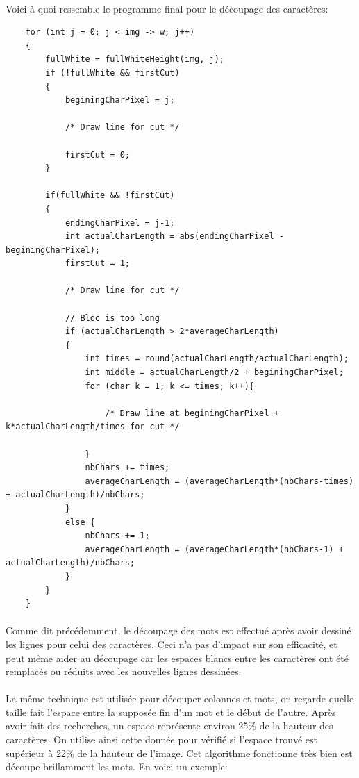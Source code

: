 \documentclass{article}
\begin{document}
	\paragraph{}
	Voici à quoi ressemble le programme final pour le découpage des caractères:
	\begin{lstlisting}
	for (int j = 0; j < img -> w; j++)
    {
        fullWhite = fullWhiteHeight(img, j);
        if (!fullWhite && firstCut)
        {
            beginingCharPixel = j;

            /* Draw line for cut */

            firstCut = 0;
        }
        
        if(fullWhite && !firstCut) 
        {
            endingCharPixel = j-1;
            int actualCharLength = abs(endingCharPixel - beginingCharPixel);
            firstCut = 1;
            
            /* Draw line for cut */

            // Bloc is too long
            if (actualCharLength > 2*averageCharLength)
            {
                int times = round(actualCharLength/actualCharLength);
                int middle = actualCharLength/2 + beginingCharPixel;
                for (char k = 1; k <= times; k++){
                    
                    /* Draw line at beginingCharPixel + k*actualCharLength/times for cut */

                }
                nbChars += times;
                averageCharLength = (averageCharLength*(nbChars-times) + actualCharLength)/nbChars;
            }
            else {
                nbChars += 1;
                averageCharLength = (averageCharLength*(nbChars-1) + actualCharLength)/nbChars;
            }
        }
    }
	\end{lstlisting}
	
	\paragraph{}
	Comme dit précédemment, le découpage des mots est effectué après avoir dessiné les lignes pour celui des caractères. Ceci n'a pas d'impact sur son efficacité, et peut même aider au découpage car les espaces blancs entre les caractères ont été remplacés ou réduits avec les nouvelles lignes dessinées.
	
	\paragraph{}
	La même technique est utilisée pour découper colonnes et mots, on regarde quelle taille fait l'espace entre la supposée fin d'un mot et le début de l'autre. Après avoir fait des recherches, un espace représente environ 25\% de la hauteur des caractères. On utilise ainsi cette donnée pour vérifié si l'espace trouvé est supérieur à 22\% de la hauteur de l'image. Cet algorithme fonctionne très bien est découpe brillamment les mots. En voici un exemple: \\
	
\end{document}
